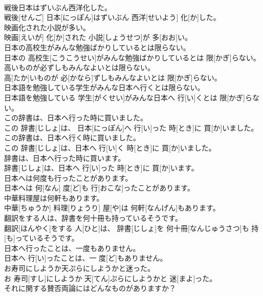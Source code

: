 \documentclass[8pt]{extreport}
\begin{document}
\begin{CJK}{UTF8}{min}
\\	戦後日本はずいぶん西洋化した。	
\\	戦後[せんご] 日本[にっぽん]はずいぶん 西洋[せいよう] 化[か]した。	
\\	映画化された小説が多い。	
\\	映画[えいが] 化[か]された 小説[しょうせつ]が 多[おお]い。	
\\	日本の高校生がみんな勉強ばかりしているとは限らない。	
\\	日本の 高校生[こうこうせい]がみんな勉強ばかりしているとは 限[かぎ]らない。	
\\	高いものが必ずしもみんなよいとは限らない。	
\\	高[たか]いものが 必[かなら]ずしもみんなよいとは 限[かぎ]らない。	
\\	日本語を勉強している学生がみんな日本へ行くとは限らない。	
\\	日本語を勉強している 学生[がくせい]がみんな日本へ 行[い]くとは 限[かぎ]らない。	
\\	この辞書は、日本へ行った時に買いました。	
\\	この 辞書[じしょ]は、 日本[にっぽん]へ 行[い]った 時[とき]に 買[か]いました。	
\\	この辞書は、日本へ行く時に買いました。	
\\	この 辞書[じしょ]は、日本へ 行[い]く 時[とき]に 買[か]いました。	
\\	辞書は、日本へ行った時に買います。	
\\	辞書[じしょ]は、日本へ 行[い]った 時[とき]に 買[か]います。	
\\	日本へは何度も行ったことがあります。	
\\	日本へは 何[なん] 度[ど]も 行[おこな]ったことがあります。	
\\	中華料理屋は何軒もあります。	
\\	中華[ちゅうか] 料理[りょうり] 屋[や]は 何軒[なんげん]もあります。	
\\	翻訳をする人は、辞書を何十冊も持っているそうです。	
\\	翻訳[ほんやく]をする 人[ひと]は、 辞書[じしょ]を 何十冊[なんじゅうさつ]も 持[も]っているそうです。	
\\	日本へ行ったことは、一度もありません。	
\\	日本へ 行[い]ったことは、一 度[ど]もありません。	
\\	お寿司にしようか天ぷらにしようかと迷った。	
\\	お 寿司[すし]にしようか 天[てん]ぷらにしようかと 迷[まよ]った。	
\\	それに関する賛否両論にはどんなものがありますか？	

\end{CJK}
\end{document}
